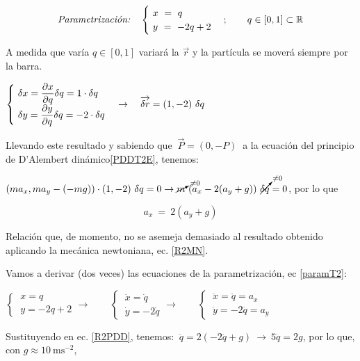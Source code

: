 \begin{equation}
\label{paramT2}
\text{\emph{Parametrización:}}\quad 
\begin{cases}
\ x\ = \ q \\ \ y \ = \ -2q+2
\end{cases} ; \qquad q \in [0,1] \subset \mathbb R
\end{equation}

A medida que varía $q \in [0,1]$ variará la $\overrightarrow r$ y la partícula se moverá siempre por la barra.

$\begin{cases} 
	 \displaystyle \ \var x = \pdv{x}{q} \var q = 1\cdot \var q \\ \displaystyle \ \var y = \pdv{y}{q} \var q = -2  \cdot \var q
\end{cases} \to \quad \overrightarrow{\var r} = (1,-2) \ \var q $

Llevando este resultado y sabiendo que $\ \overrightarrow P=(0,-P)\ $ a la ecuación del principio de D'Alembert dinámico\ref{PDDT2E}, tenemos:

$(ma_x,ma_y-(-mg)) \cdot (1,-2) \ \var q =0 \to \cancelto{\neq 0}{m} \ (a_x-2(a_y+g)) \ \cancelto{\neq 0} {\var q} = 0$, por lo que

\begin{equation}
\label{R2PDD}
\boxed{ \ a_x \ = \ 2 (a_y+g) \ }	
\end{equation}

Relación que, de momento, no se asemeja demasiado al resultado obtenido aplicando la mecánica newtoniana, ec. \ref{R2MN}.

Vamos a derivar (dos veces) las ecuaciones de la parametrización, ec \ref{paramT2}:

$\begin{cases}
\ x =  q \\ \ y  = -2q+2
\end{cases} \to \qquad \begin{cases}
 \  \dot x = \dot q \\ \ \dot y = -2 \dot q
 \end{cases} \to \qquad \begin{cases}
 \ \ddot x= \ddot q =a_x	 \\ \ \ddot y=-2\ddot q = a_y
 \end{cases}$

Sustituyendo en ec. \ref{R2PDD}, tenemos: $\ \ddot q=2(-2\ddot q +g) \ \to \ 5\ddot q= 2g$, por lo que, con $g\approx 10 \ \mathrm{ms}^{-2}$,

